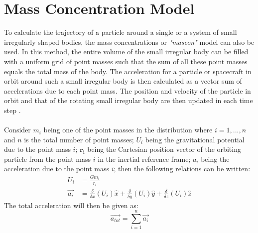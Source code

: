 \section{Mass Concentration Model}
\label{mascon}
To calculate the trajectory of a particle around a single or a system of small irregularly shaped bodies, the mass concentrations or \textit{"mascon"} model can also be used. In this method, the entire volume of the small irregular body can be filled with a uniform grid of point masses such that the sum of all these point masses equals the total mass of the body. The acceleration for a particle or spacecraft in orbit around such a small irregular body is then calculated as a vector sum of accelerations due to each point mass. The position and velocity of the particle in orbit and that of the rotating small irregular body are then updated in each time step \cite{mascon}. \\\\
Consider $m_i$ being one of the point masses in the distribution where $i = 1,..., n$ and $n$ is the total number of point masses; $U_i$ being the gravitational potential due to the point mass $i$; $\mathbf{r_i}$ being the Cartesian position vector of the orbiting particle from the point mass $i$ in the inertial reference frame; $a_i$ being the acceleration due to the point mass $i$; then the following relations can be written:
\begin{align}
U_i &= \frac{Gm_i}{r_i} \\
\overrightarrow{a_i} &= \frac{\delta}{\delta x} (U_i) \hat{x} + \frac{\delta}{\delta y} (U_i) \hat{y} + \frac{\delta}{\delta z} (U_i) \hat{z}
\end{align}
%
The total acceleration will then be given as:
\begin{equation}
\overrightarrow{a_{tot}} = \sum_{i=1}^n \overrightarrow{a_i}
\end{equation}
%

